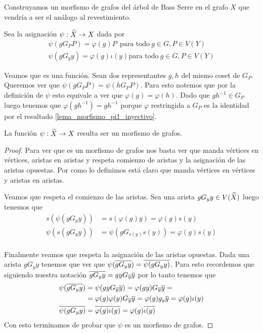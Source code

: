 \documentclass[tesis.tex]{subfiles}
\begin{document}
Construyamos un morfismo de grafos del árbol de Bass Serre en el grafo $X$ que vendría a ser el análogo al revestimiento.

Sea la asignación $\psi: \widetilde X \to X$ dada por 
\begin{align*}
	\psi(g G_P P) = \varphi(g) P \ \ \text{para todo} \ g \in G, P \in V(Y) \\
	\psi(g G_y y) = \varphi(g) \iota(y) \text{para todo} \ g \in G, P \in V(Y)
\end{align*}

Veamos que es una función.
Sean dos representantes $g,h$ del mismo coset de $G_P$. 
Queremos ver que $\psi(gG_PP) = \psi(hG_P P)$.
Para esto notemos que por la definición de $\psi$  esto equivale a ver que $\varphi(g) = \varphi(h)$.
Dado que $gh^{-1} \in G_P$ luego tenemos que $\varphi(gh^{-1}) = gh^{-1}$ porque $\varphi$ restringida a $G_P$ es la identidad por el resultado \ref{lema_morfismo_pi1_inyectivo}.

\begin{lema}
	La función $\psi: \widetilde X \to X$ resulta ser un morfismo de grafos.
\end{lema}

\begin{proof}
Para ver que es un morfismo de grafos nos basta ver que manda vértices en vértices, aristas en aristas y respeta comienzo de aristas y la asignación de las aristas opuestas.
Por como lo definimos está claro que manda vértices en vértices y aristas en aristas.

Veamos que respeta el comienzo de las aristas.
Sea una arista $gG_y y \in V(\widetilde X)$ luego tenemos que 
\begin{align*}
s(\psi(gG_y y )) &= s (\varphi(g)  y) =  \varphi(g) s(y) 	\\ 
\psi(s(gG_y y))  &= \psi(gG_{s(y)} s(y)) = \varphi(g){s(y)} \\
\end{align*}	

Finalmente veamos que respeta la asignación de las aristas opuestas.	
Dada una arista $g G_y y$ tenemos que ver que $\psi(\overline{g G_y y}) = \overline{\psi(g G_y y)}$.	
Para esto recordemos que siguiendo nuestra notación $\overline{g G_y y} = gyG_{\overline y} \overline y $ por lo tanto tenemos que 
\begin{align*}
\psi(\overline{gG_y y }) &= \psi(gyG_{\overline y} \overline y) = \varphi(gy) G_{\overline y} \overline y =         \\ 
&= \varphi(g)\varphi(y) G_{\overline y} \overline y = \varphi(g) g_y \overline y = \varphi(g) \iota(y) \\
\overline{\psi(gG_y y)} &= \overline{ \varphi(g) \iota(y) } = \varphi(g) \overline{ \iota(y)} 
\end{align*}
Con esto terminamos de probar que $\psi$ es un morfismo de grafos.
\end{proof}
\end{document}
